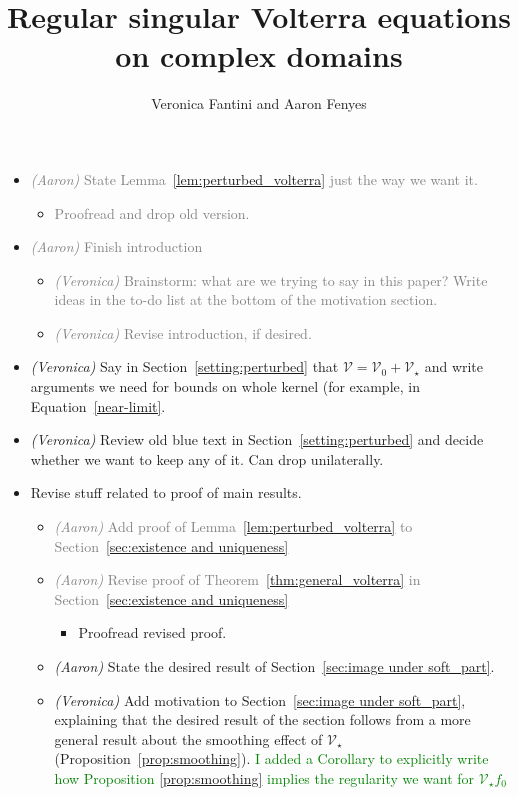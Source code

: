 \documentclass{article}
\title{Regular singular Volterra equations on complex domains}
\author{Veronica Fantini and Aaron Fenyes}
\date{}
\theoremstyle{plain}
\newcommand{\volterra}{\mathcal{V}}
\newcommand{\hardpart}{\mathcal{V}_0}
\newcommand{\softpart}{\mathcal{V}_\star}
\newenvironment{brainstorm}{\color{violet}\begin{itemize}}{\end{itemize}\color{black}}
\begin{document}
\maketitle
\begin{brainstorm}
\item \textcolor{gray}{\textit{(Aaron)} State Lemma~\ref{lem:perturbed_volterra} just the way we want it.}
\begin{itemize}
    \item \textcolor{gray}{Proofread and drop old version.}
\end{itemize}
\item \textcolor{gray}{\textit{(Aaron)} Finish introduction}
\begin{itemize}
\item \textcolor{gray}{\textit{(Veronica)} Brainstorm: what are we trying to say in this paper? Write ideas in the to-do list at the bottom of the motivation section.}
\item \textcolor{gray}{\textit{(Veronica)} Revise introduction, if desired.}
\end{itemize}
\color{gray}
\item \textit{(Veronica)} Say in Section~\ref{setting:perturbed} that $\volterra = \hardpart + \softpart$ and write arguments we need for bounds on whole kernel (for example, in Equation~\ref{near-limit}.
\color{gray}
\item \textit{(Veronica)} Review old blue text in Section~\ref{setting:perturbed} and decide whether we want to keep any of it. Can drop unilaterally. 
\color{violet}
\item Revise stuff related to proof of main results.
\begin{itemize}
        \item \textcolor{gray}{\textit{(Aaron)} Add proof of Lemma~\ref{lem:perturbed_volterra} to Section~\ref{sec:existence and uniqueness}}
        \item \textcolor{gray}{\textit{(Aaron)} Revise proof of Theorem~\ref{thm:general_volterra} in Section~\ref{sec:existence and uniqueness}}
        \begin{itemize}
            \item Proofread revised proof.
        \end{itemize}
        \item \textit{(Aaron)} State the desired result of Section~\ref{sec:image under soft_part}.
        \color{gray}
        \item \textit{(Veronica)} Add motivation to Section~\ref{sec:image under soft_part}, explaining that the desired result of the section follows from a more general result about the smoothing effect of $\softpart$ (Proposition~\ref{prop:smoothing}). \textcolor{green}{I added a Corollary to explicitly write how Proposition \ref{prop:smoothing} implies the regularity we want for $\softpart f_0$}

\end{itemize}
\end{brainstorm}
\end{document}
